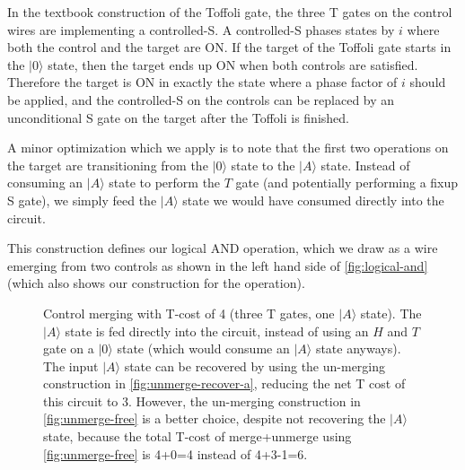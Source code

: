 \documentclass[twocolumn,longbibliography]{quantumarticle-customized}
\newcommand{\qH}{\gate{H}}
\newcommand{\qT}{\gate{T}}
\newcommand{\qTi}{\gate{T^\dagger}}
\newcommand{\qS}{\gate{S}}
\begin{document}
In the textbook construction of the Toffoli gate, the three T gates on the control wires are implementing a controlled-S.
A controlled-S phases states by $i$ where both the control and the target are ON.
If the target of the Toffoli gate starts in the $|0\rangle$ state, then the target ends up ON when both controls are satisfied.
Therefore the target is ON in exactly the state where a phase factor of $i$ should be applied, and the controlled-S on the controls can be replaced by an unconditional S gate on the target after the Toffoli is finished.

A minor optimization which we apply is to note that the first two operations on the target are transitioning from the $|0\rangle$ state to the $|A\rangle$ state.
Instead of consuming an $|A\rangle$ state to perform the $T$ gate (and potentially performing a fixup S gate), we simply feed the $|A\rangle$ state we would have consumed directly into the circuit.

This construction defines our logical AND operation, which we draw as a wire emerging from two controls as shown in the left hand side of \autoref{fig:logical-and} (which also shows our construction for the operation).

\begin{figure}
  \resizebox{\linewidth}{!}{
    \Qcircuit @R=1.5em @C=0.7em {
      &x &&\ctrl{1} &\qw & x  && &&          &&\qw      &\qw  &\ctrl{2} &\qw &\qw      &\qw  &\qw &\qw &\qw &\\
      &y &&\ctrl{1} &\qw & y  &&=&&          &&\ctrl{1} &\qw  &\qw      &\qw &\ctrl{1} &\qw  &\qw &\qw &\qw &\\
      &  &&         &\qw & xy && &&|A\rangle &&\targ    &\qTi &\targ    &\qT &\targ    &\qTi &\qH &\qS &\qw &\\
    }
  }
  \caption{
	Control merging with T-cost of 4 (three T gates, one $|A\rangle$ state).
	The $|A\rangle$ state is fed directly into the circuit, instead of using an $H$ and $T$ gate on a $|0\rangle$ state (which would consume an $|A\rangle$ state anyways).
	The input $|A\rangle$ state can be recovered by using the un-merging construction in \autoref{fig:unmerge-recover-a}, reducing the net T cost of this circuit to 3.
	However, the un-merging construction in \autoref{fig:unmerge-free} is a better choice, despite not recovering the $|A\rangle$ state, because the total T-cost of merge+unmerge using \autoref{fig:unmerge-free} is 4+0=4 instead of 4+3-1=6.
  }
  \label{fig:logical-and}
\end{figure}
\end{document}
